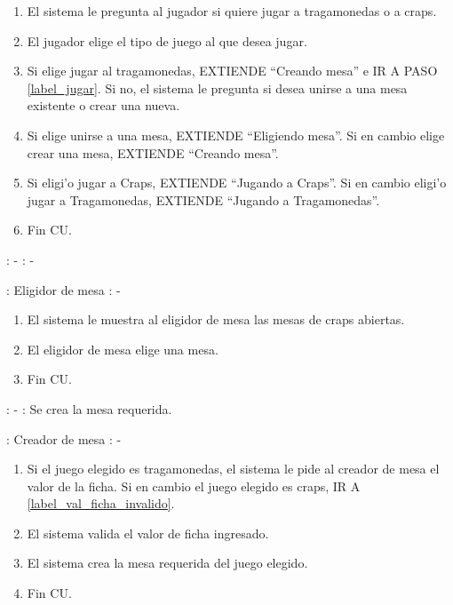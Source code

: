 \begin{enumerate}
\item El sistema le pregunta al jugador si quiere jugar a tragamonedas o a craps.
\item El jugador elige el tipo de juego al que desea jugar.
\item Si elige jugar al tragamonedas, EXTIENDE ``Creando mesa'' e IR A PASO \ref{label_jugar}. Si no, el sistema le pregunta si desea unirse a una mesa existente o crear una nueva.
\item Si elige unirse a una mesa, EXTIENDE ``Eligiendo mesa''. Si en cambio elige crear una mesa, EXTIENDE ``Creando mesa''.
\item Si eligi'o jugar a Craps, EXTIENDE ``Jugando a Craps''. Si en cambio eligi'o jugar a Tragamonedas, EXTIENDE ``Jugando a Tragamonedas''.\label{label_jugar}
\item Fin CU.
\end{enumerate}



: - \newline
\indent{}: -

: Eligidor de mesa \newline
\indent{}: -

\begin{enumerate}
\item El sistema le muestra al eligidor de mesa las mesas de craps abiertas.
\item El eligidor de mesa elige una mesa.
\item Fin CU.
\end{enumerate}



: - \newline
\indent{}: Se crea la mesa requerida.

: Creador de mesa \newline
\indent{}: -

\begin{enumerate}
\item Si el juego elegido es tragamonedas, el sistema le pide al creador de mesa el valor de la ficha. Si en cambio el juego elegido es craps, IR A \ref{label_val_ficha_invalido}. \label{cu_pedir_valor}
\item El sistema valida el valor de ficha ingresado.
\item El sistema crea la mesa requerida del juego elegido. \label{label_val_ficha_invalido}
\item Fin CU.
\end{enumerate}

